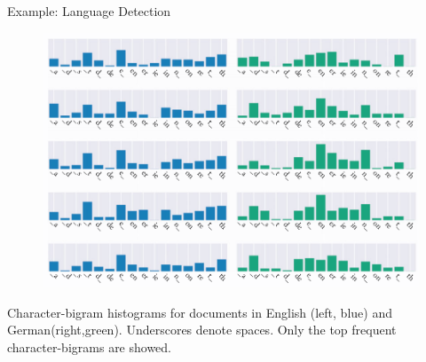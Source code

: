 \documentclass[handout]{beamer}
\begin{document}
\begin{frame}{Example: Language Detection}


\begin{figure}[htb]
	\centering
	 \includegraphics[scale=0.26]{pics/langbigrams.png}
\end{figure}

\scriptsize{Character-bigram histograms for documents in English (left, blue) and German(right,green). Underscores denote spaces. Only the top frequent character-bigrams are showed.}


\end{frame}
\end{document}
